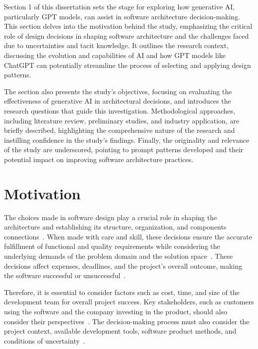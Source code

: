 Section 1 of this dissertation sets the stage for exploring how generative AI, particularly GPT models, can assist in software architecture decision-making. This section delves into the motivation behind the study, emphasizing the critical role of design decisions in shaping software architecture and the challenges faced due to uncertainties and tacit knowledge. It outlines the research context, discussing the evolution and capabilities of AI and how GPT models like ChatGPT can potentially streamline the process of selecting and applying design patterns. 

The section also presents the study's objectives, focusing on evaluating the effectiveness of generative AI in architectural decisions, and introduces the research questions that guide this investigation. Methodological approaches, including literature review, preliminary studies, and industry application, are briefly described, highlighting the comprehensive nature of the research and instilling confidence in the study's findings. Finally, the originality and relevance of the study are underscored, pointing to prompt patterns developed and their potential impact on improving software architecture practices.

\section{Motivation}\label{sec:motivation}
The choices made in software design play a crucial role in shaping the architecture and establishing its structure, organization, and components connections~\cite{perry1992}. When made with care and skill, these decisions ensure the accurate fulfillment of functional and quality requirements while considering the underlying demands of the problem domain and the solution space~\cite{bhukya2016,yu2018,ahuja2019}. These decisions affect expenses, deadlines, and the project's overall outcome, making the software successful or unsuccessful~\cite{garousi2019}.

Therefore, it is essential to consider factors such as cost, time, and size of the development team for overall project success. Key stakeholders, such as customers using the software and the company investing in the product, should also consider their perspectives~\cite{brooks1974mythical,reinertsen1997managing,cohn2005agile,bass2012software}. The decision-making process must also consider the project context, available development tools, software product methods, and conditions of uncertainty~\cite{berntsson2006,hicdurmaz2012,viviani2023empirical}.

